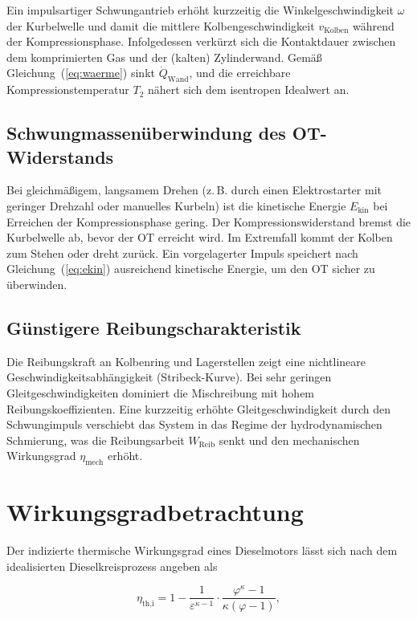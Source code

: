 ﻿\documentclass[a4paper,12pt]{article}
\begin{document}
Ein impulsartiger Schwungantrieb erhöht kurzzeitig die Winkelgeschwindigkeit $\omega$
der Kurbelwelle und damit die mittlere Kolbengeschwindigkeit $v_\text{Kolben}$ während
der Kompressionsphase. Infolgedessen verkürzt sich die Kontaktdauer zwischen dem
komprimierten Gas und der (kalten) Zylinderwand. Gemäß Gleichung~(\ref{eq:waerme})
sinkt $\dot{Q}_\text{Wand}$, und die erreichbare Kompressionstemperatur $T_2$
nähert sich dem isentropen Idealwert an.

\subsection{Schwungmassenüberwindung des OT-Widerstands}

Bei gleichmäßigem, langsamem Drehen (z.\,B. durch einen Elektrostarter mit geringer
Drehzahl oder manuelles Kurbeln) ist die kinetische Energie $E_\text{kin}$ bei
Erreichen der Kompressionsphase gering. Der Kompressionswiderstand bremst die
Kurbelwelle ab, bevor der OT erreicht wird. Im Extremfall kommt der Kolben zum
Stehen oder dreht zurück. Ein vorgelagerter Impuls speichert nach
Gleichung~(\ref{eq:ekin}) ausreichend kinetische Energie, um den OT sicher zu
überwinden.

\subsection{Günstigere Reibungscharakteristik}

Die Reibungskraft an Kolbenring und Lagerstellen zeigt eine nichtlineare
Geschwindigkeitsabhängigkeit (Stribeck-Kurve). Bei sehr geringen Gleitgeschwindigkeiten
dominiert die Mischreibung mit hohem Reibungskoeffizienten. Eine kurzzeitig erhöhte
Gleitgeschwindigkeit durch den Schwungimpuls verschiebt das System in das Regime der
hydrodynamischen Schmierung, was die Reibungsarbeit $W_\text{Reib}$ senkt und den
mechanischen Wirkungsgrad $\eta_\text{mech}$ erhöht.

\section{Wirkungsgradbetrachtung}

Der indizierte thermische Wirkungsgrad eines Dieselmotors lässt sich nach dem
idealisierten Dieselkreisprozess angeben als

\begin{equation}
  \eta_\text{th,i} = 1 - \frac{1}{\varepsilon^{\kappa-1}} \cdot
    \frac{\varphi^\kappa - 1}{\kappa(\varphi - 1)},
  \label{eq:eta_diesel}
\end{equation}
\end{document}
